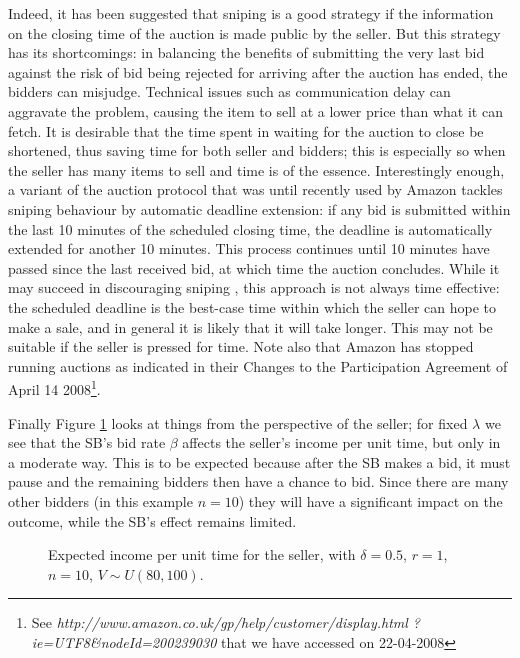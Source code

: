 \documentclass{article}
\begin{document}
Indeed, it has been suggested that sniping is a good strategy
\cite{roth02,ockenfels06,bajari03} if the information on the
closing time of the auction is made public by the seller. But this
strategy has its shortcomings: in balancing the benefits of
submitting the very last bid against the risk of bid being
rejected for arriving after the auction has ended, the bidders can
misjudge. Technical issues such as communication delay can
aggravate the problem, causing the item to sell at a lower price
than what it can fetch. It is desirable that the time spent in
waiting for the auction to close be shortened, thus saving time
for both seller and bidders; this is especially so when the seller
has many items to sell and time is of the essence. Interestingly
enough, a variant of the auction protocol that was until recently
used by Amazon tackles sniping behaviour by automatic deadline
extension: if any bid is submitted within the last 10 minutes of
the scheduled closing time, the deadline is automatically extended
for another 10 minutes. This process continues until 10 minutes
have passed since the last received bid, at which time the auction
concludes. While it may succeed in discouraging sniping
\cite{ockenfels06}, this approach is not always time effective:
the scheduled deadline is the best-case time within which the
seller can hope to make a sale, and in general it is likely that
it will take longer. This may not be suitable if the seller is
pressed for time. Note also that Amazon has stopped running
auctions as indicated in their Changes to the Participation
Agreement of April 14 2008\footnote{See
\emph{http://www.amazon.co.uk/gp/help/customer/display.html
?ie=UTF8\&nodeId=200239030} that we have accessed on 22-04-2008}.


Finally Figure \ref{fig:ExpIncomePerTime} looks at things from the
perspective of the seller; for fixed $\lambda$ we see that the
SB's bid rate $\beta$ affects the seller's income per unit time,
but only in a moderate way. This is to be expected because after
the SB makes a bid, it must pause and the remaining bidders then
have a chance to bid. Since there are many other bidders (in this
example $n=10$) they will have a significant impact on the
outcome, while the SB's effect remains limited.

\begin{figure}
\centering
\caption{Expected income per unit time for the seller, with
$\delta=0.5$, $r=1$, $n=10$, $V\sim
U(80,100)$.}\label{fig:ExpIncomePerTime}
\end{figure}
\end{document}
